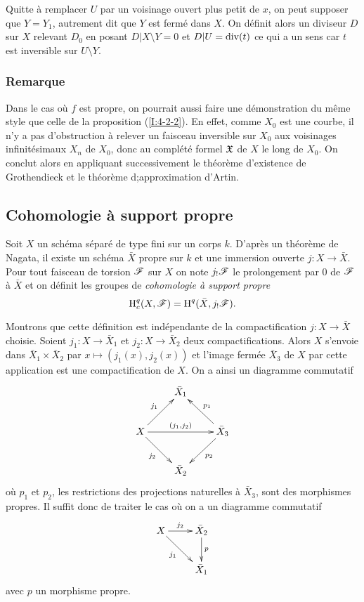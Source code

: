 \documentclass[oneside]{book}
\begin{document}
Quitte à remplacer $U$ par un voisinage ouvert plus petit de $x$, on peut 
supposer que $Y=Y_1$, autrement dit que $Y$ est fermé dans $X$. On définit 
alors un diviseur $D$ sur $X$ relevant $D_0$ en posant $D|X\setminus Y=0$ et 
$D|U=\operatorname{div}(t)$ ce qui a un sens car $t$ est inversible sur $U\setminus Y$. 





\subsubsection{Remarque}\label{I:4-4-2}

Dans le cas où $f$ est propre, on pourrait aussi faire une démonstration 
du même style que celle de la proposition (\ref{I:4-2-2}). En effet, comme 
$X_0$ est une courbe, il n'y a pas d'obstruction à relever un faisceau 
inversible sur $X_0$ aux voisinages infinitésimaux $X_n$ de $X_0$, donc au 
complété formel $\mathfrak{X}$ de $X$ le long de $X_0$. On conclut alors en 
appliquant successivement le théorème d'existence de Grothendieck et le 
théorème d;approximation d'Artin. 










\subsection{Cohomologie à support propre}\label{I:4-5}





\begin{definition}\label{I:4-5-1}
Soit $X$ un schéma séparé de type fini sur un corps $k$. D'après un 
théorème de Nagata, il existe un schéma $\bar X$ propre sur $k$ et une 
immersion ouverte $j:X\to\bar X$. Pour tout faisceau de torsion $\mathscr{F}$ sur $X$ on 
note $j_! \mathscr{F}$ le prolongement par $0$ de $\mathscr{F}$ à $\bar X$ et on définit les 
groupes de \emph{cohomologie à support propre} 
\[
  \operatorname{H}_c^q(X,\mathscr{F})=\operatorname{H}^q(\bar X, j_! \mathscr{F}) \text{.}
\]
\end{definition}

Montrons que cette définition est indépendante de la compactification 
$j:X\to\bar X$ choisie. Soient $j_1:X\to \bar X_1$ et $j_2:X\to \bar X_2$ deux 
compactifications. Alors $X$ s'envoie dans $\bar X_1\times \bar X_2$ par 
$x\mapsto (j_1(x),j_2(x))$ et l'image fermée $\bar X_3$ de $X$ par cette 
application est une compactification de $X$. On a ainsi un diagramme commutatif 
\[\xymatrix{
  & \bar X_1 \\
  X \ar[ur]^-{j_1} \ar[rr]^-{(j_1,j_2)} \ar[dr]_-{j_2} 
    & & \bar X_3 \ar[ul]_-{p_1} \ar[dl]^-{p_2} \\
  & \bar X_2
}\]
où $p_1$ et $p_2$, les restrictions des projections naturelles à 
$\bar X_3$, sont des morphismes propres. Il suffit donc de traiter le cas où 
on a un diagramme commutatif 
\[\xymatrix{
  X \ar[r]^-{j_2} \ar[dr]_-{j_1} 
    & \bar X_2 \ar[d]^-p \\
  & \bar X_1
}\]
avec $p$ un morphisme propre. 
\end{document}

